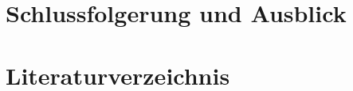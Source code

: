 \documentclass[a4,abstract=on]{scrartcl}
\newcommand*\stdsection{}
\let\stdsection\section
\renewcommand*\section{%
    \clearpage\ifodd\value{page}\else\mbox{}\clearpage\fi
    \stdsection}
\begin{document}
\section{Schlussfolgerung und Ausblick}





	\clearpage
	\appendix
	\section{Literaturverzeichnis}
		\begingroup
			\renewcommand{\section}[2]{}
			
			
		\endgroup
\clearpage
\end{document}
